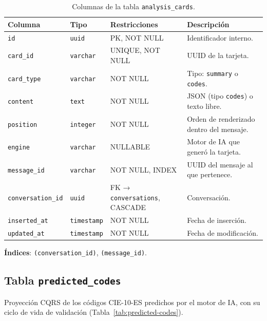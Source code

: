 \begin{table}[H]
\centering
\footnotesize
\caption{Columnas de la tabla \texttt{analysis\_cards}.}
\label{tab:cards}
\begin{tabular}{llP{3.2cm}P{4.5cm}}
\hline
\textbf{Columna} & \textbf{Tipo} & \textbf{Restricciones} & \textbf{Descripción} \\
\hline
\texttt{id}               & \texttt{uuid}    & PK, NOT NULL           & Identificador interno. \\
\texttt{card\_id}         & \texttt{varchar} & UNIQUE, NOT NULL       & UUID de la tarjeta. \\
\texttt{card\_type}       & \texttt{varchar} & NOT NULL               & Tipo: \texttt{summary} o \texttt{codes}. \\
\texttt{content}          & \texttt{text}    & NOT NULL               & JSON (tipo \texttt{codes}) o texto libre. \\
\texttt{position}         & \texttt{integer} & NOT NULL               & Orden de renderizado dentro del mensaje. \\
\texttt{engine}           & \texttt{varchar} & NULLABLE               & Motor de IA que generó la tarjeta. \\
\texttt{message\_id}      & \texttt{varchar} & NOT NULL, INDEX        & UUID del mensaje al que pertenece. \\
\texttt{conversation\_id} & \texttt{uuid}    & FK → \texttt{conversations}, CASCADE & Conversación. \\
\texttt{inserted\_at}     & \texttt{timestamp} & NOT NULL           & Fecha de inserción. \\
\texttt{updated\_at}      & \texttt{timestamp} & NOT NULL           & Fecha de modificación. \\
\hline
\end{tabular}
\end{table}

\textbf{Índices}: \texttt{(conversation\_id)}, \texttt{(message\_id)}.

\subsection{Tabla \texttt{predicted\_codes}}

Proyección CQRS de los códigos CIE-10-ES predichos por el motor de IA, con su ciclo de vida de validación (Tabla~\ref{tab:predicted-codes}).


